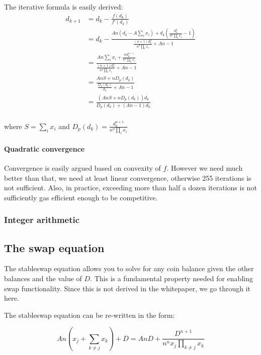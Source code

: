 \documentclass[
]{article}
\begin{document}
The iterative formula is easily derived: \[\begin{aligned}
d_{k+1} &= d_k - \frac{f(d_k)}{f'(d_k)} \\
&= d_k - \frac{A n (d_k - A \sum_i x_i)  + d_k(\frac{d_k^{n}}{n^n \prod_i x_i} - 1)}{\frac{(n+1)d_k^n}{n^n \prod_i x_i} + An - 1} \\
&= \frac{An\sum_i x_i + \frac{nd_k^{n+1}}{n^n \prod_i x_i}}{\frac{(n+1)d_k^n}{n^n\prod_i x_i} + An - 1} \\
&= \frac{AnS + nD_p(d_k)}{\frac{D_p(d_k)}{d_k} + An - 1} \\
&= \frac{(AnS + nD_p(d_k))d_k}{D_p(d_k) + (An-1)d_k}\\
\end{aligned}\]

where \(S = \sum_i x_i\) and
\(D_p(d_k) = \frac{d_k^{n+1}}{n^n \prod_i x_i}\)

\hypertarget{quadratic-convergence}{%
\paragraph{Quadratic convergence}\label{quadratic-convergence}}

Convergence is easily argued based on convexity of \(f\). However we
need much better than that, we need at least linear convergence,
otherwise 255 iterations is not sufficient. Also, in practice, exceeding
more than half a dozen iterations is not sufficiently gas efficient
enough to be competitive.

\hypertarget{integer-arithmetic}{%
\subsubsection{Integer arithmetic}\label{integer-arithmetic}}

\hypertarget{the-swap-equation}{%
\subsection{The swap equation}\label{the-swap-equation}}

The stableswap equation allows you to solve for any coin balance given
the other balances and the value of \(D\). This is a fundamental
property needed for enabling swap functionality. Since this is not
derived in the whitepaper, we go through it here.

The stableswap equation can be re-written in the form:

\[ An\left(x_j + \sum_{k\neq j} x_k\right) + D = AnD + \frac{D^{n+1}}{n^n x_j \prod_{k\neq j} x_k} \]
\end{document}
